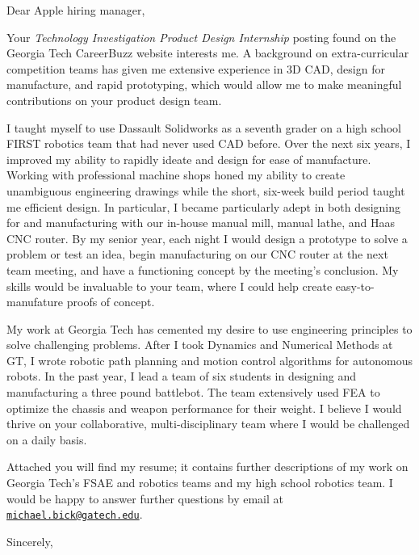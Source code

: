 \documentclass[12pt]{cover_letter}
\date{March 4, 2018}
\begin{document}
  \begin{letter}{}

    \opening{Dear Apple hiring manager,}

    \thispagestyle{fancy}

    Your \textit{Technology Investigation Product Design Internship} posting found on the Georgia Tech CareerBuzz website interests me. A background on extra-curricular competition teams has given me extensive experience in 3D CAD, design for manufacture, and rapid prototyping, which would allow me to make meaningful contributions on your product design team.

    I taught myself to use Dassault Solidworks as a seventh grader on a high school FIRST robotics team that had never used CAD before. Over the next six years, I improved my ability to rapidly ideate and design for ease of manufacture. Working with professional machine shops honed my ability to create unambiguous engineering drawings while the short, six-week build period taught me efficient design. In particular,  I became particularly adept in both designing for and manufacturing with our in-house manual mill, manual lathe, and Haas CNC router. By my senior year, each night I would design a prototype to solve a problem or test an idea, begin manufacturing on our CNC router at the next team meeting, and have a functioning concept by the meeting's conclusion. My skills would be invaluable to your team, where I could help create easy-to-manufature proofs of concept.

    My work at Georgia Tech has cemented my desire to use engineering principles to solve challenging problems. After I took Dynamics and Numerical Methods at GT, I wrote robotic path planning and motion control algorithms for autonomous robots. In the past year, I lead a team of six students in designing and manufacturing a three pound battlebot. The team extensively used FEA to optimize the chassis and weapon performance for their weight. I believe I would thrive on your collaborative, multi-disciplinary team where I would be challenged on a daily basis.

    Attached you will find my resume; it contains further descriptions of my work on Georgia Tech's FSAE and robotics teams and my high school robotics team. I would be happy to answer further questions by email at \href{mailto:michael.bick@gatech.edu}{\nolinkurl{michael.bick@gatech.edu}}.

    \closing{Sincerely,}

  \end{letter}

\end{document}
